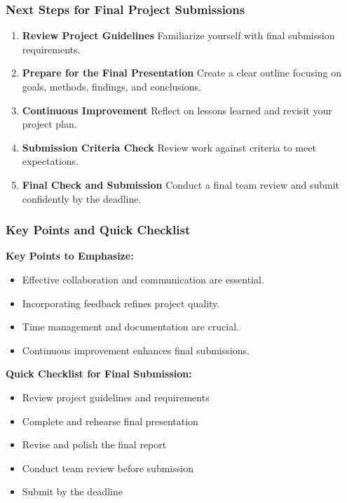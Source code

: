 \documentclass{beamer}
\begin{document}
\begin{frame}[fragile]
    \frametitle{Next Steps for Final Project Submissions}
    \begin{enumerate}
        \item \textbf{Review Project Guidelines}  
            Familiarize yourself with final submission requirements.
            
        \item \textbf{Prepare for the Final Presentation}  
            Create a clear outline focusing on goals, methods, findings, and conclusions.
            
        \item \textbf{Continuous Improvement}  
            Reflect on lessons learned and revisit your project plan.
            
        \item \textbf{Submission Criteria Check}  
            Review work against criteria to meet expectations.
        
        \item \textbf{Final Check and Submission}  
            Conduct a final team review and submit confidently by the deadline.
    \end{enumerate}
\end{frame}

\begin{frame}[fragile]
    \frametitle{Key Points and Quick Checklist}
    \textbf{Key Points to Emphasize:}
    \begin{itemize}
        \item Effective collaboration and communication are essential.
        \item Incorporating feedback refines project quality.
        \item Time management and documentation are crucial.
        \item Continuous improvement enhances final submissions.
    \end{itemize}
    
    \textbf{Quick Checklist for Final Submission:}
    \begin{itemize}
        \item [ ] Review project guidelines and requirements
        \item [ ] Complete and rehearse final presentation
        \item [ ] Revise and polish the final report
        \item [ ] Conduct team review before submission
        \item [ ] Submit by the deadline
    \end{itemize}
\end{frame}
\end{document}
